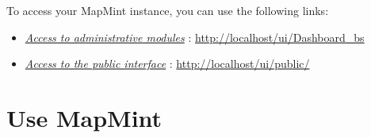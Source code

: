 \documentclass[letterpaper,10pt,english]{sphinxmanual}
\begin{document}
To access your MapMint instance, you can use the following links:
\begin{itemize}
\item {} 
{\hyperref[introduction/usemapmint:introduction-usemapmint-administration-access]{\emph{Access to administrative modules}}} : \href{http://localhost/ui/Dashboard\_bs}{http://localhost/ui/Dashboard\_bs}

\item {} 
{\hyperref[introduction/usemapmint:introduction-usemapmint-public-access]{\emph{Access to the public interface}}} : \href{http://localhost/ui/public/}{http://localhost/ui/public/}

\end{itemize}


\section{Use MapMint}
\end{document}
